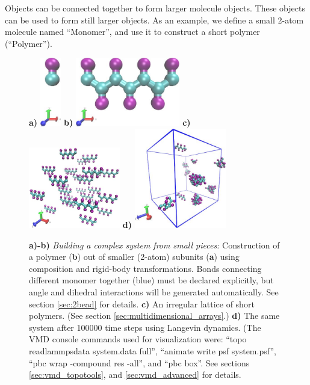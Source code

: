 \documentclass[11pt]{article}
\begin{document}
Objects can be connected together to form larger molecule objects.
These objects can be used to form still larger objects.
As an example, we define a small 2-atom molecule named ``Monomer'',
and use it to construct a short polymer (``Polymer'').

\begin{figure}[htbp]
\centering
\textbf{a)}
\includegraphics[height=3cm]{2bead_monomer.jpg}
\quad \quad \quad \quad \quad
\textbf{b)}
\includegraphics[height=3cm]{2bead_polymer.jpg}
\newline
\vspace{10 mm}
\newline
\textbf{c)}
\includegraphics[width=4cm]{2bead_polymers_nopbc_t=0_LR.jpg}
\textbf{d)}
\includegraphics[width=4cm]{2bead_polymers_t=100ps_LR.jpg}
\caption{
\label{fig:2bead_polymer}
\textbf{a)-b)}
\textit{Building a complex system from small pieces:}
Construction of a polymer (\textbf{b}) 
out of smaller (2-atom) subunits (\textbf{a})
using composition and rigid-body transformations. 
Bonds connecting different monomer together (blue) 
must be declared explicitly, 
but angle and dihedral interactions will be generated automatically.
See section \ref{sec:2bead} for details.
\textbf{c)}
An irregular lattice of short polymers.
(See section \ref{sec:multidimensional_arrays}.)
\textbf{d)}
The same system after 100000 time steps using Langevin dynamics.
(The VMD console commands used for visualization were:
``topo readlammpsdata system.data full'',
``animate write psf system.psf'',
``pbc wrap -compound res -all'', and 
``pbc box''.
See sections \ref{sec:vmd_topotools}, and \ref{sec:vmd_advanced}
for details.}
\end{figure}
\end{document}
